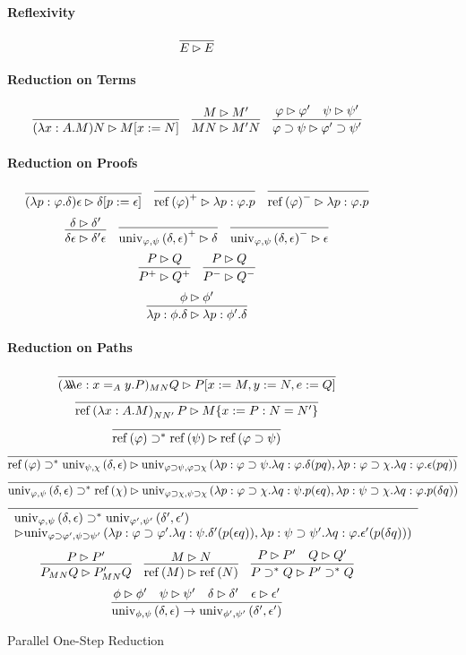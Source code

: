 \documentclass[a4paper,UKenglish]{lipics-v2016}
\newcommand*{\reff}[1]{\ensuremath{\mathrm{ref} \left( {#1} \right)}}
\newcommand*{\univ}[4]{\ensuremath{\mathrm{univ}_{{#1}, {#2}} \left({#3} , {#4} \right)}}
\newcommand*{\triplelambda}{\ensuremath{\lambda \!\! \lambda \!\! \lambda}}
\theoremstyle{plain}
\theoremstyle{definition}
\begin{document}
\begin{figure}
\paragraph*{Reflexivity}
$$ \infer{E \rhd E}{} $$
\paragraph*{Reduction on Terms}
$$ \infer{(\lambda x:A.M)N \rhd M[x:=N]}{} \quad
\infer{MN \rhd M'N}{M \rhd M'} \quad
\infer{\varphi \supset \psi \rhd \varphi' \supset \psi'}{\varphi \rhd \varphi' \quad \psi \rhd \psi'} $$
\paragraph*{Reduction on Proofs}
$$\infer{(\lambda p : \varphi . \delta)\epsilon \rhd \delta [ p := \epsilon ]}{} \quad
\infer{\reff{\varphi}^+ \rhd \lambda p : \varphi . p}{} \quad
\infer{\reff{\varphi}^- \rhd \lambda p : \varphi . p}{} $$
$$ \infer{\delta \epsilon \rhd \delta' \epsilon}{\delta \rhd \delta'} \quad
\infer{\univ{\varphi}{\psi}{\delta}{\epsilon}^+ \rhd \delta}{} \quad
\infer{\univ{\varphi}{\psi}{\delta}{\epsilon}^- \rhd \epsilon}{} $$
$$ \infer{P^+ \rhd Q^+}{P \rhd Q} \quad
\infer{P^- \rhd Q^-}{P \rhd Q}$$
$$ \infer{\lambda p:\phi.\delta \rhd \lambda p:\phi'.\delta}{\phi \rhd \phi'} $$
\paragraph*{Reduction on Paths}
$$\infer{(\triplelambda e:x =_A y.P)_{MN} Q \rhd P [x := M, y := N, e := Q]}{} $$
$$ \infer{\reff{\lambda x:A.M}_{N N'} P \rhd M \{ x:=P : N = N' \}}{} $$
$$ \infer{\reff{\varphi} \supset^* \reff{\psi} \rhd \reff{\varphi \supset \psi}}{} $$
$$ \infer{\reff{\varphi} \supset^* \univ{\psi}{\chi}{\delta}{\epsilon} \rhd
\univ{\varphi \supset \psi}{\varphi \supset \chi}{\lambda p:\varphi \supset \psi. \lambda q : \varphi. \delta (pq)}{\lambda p : \varphi \supset \chi. \lambda q : \varphi. \epsilon (pq)}}{} $$
$$ \infer{\univ{\varphi}{\psi}{\delta}{\epsilon} \supset^* \reff{\chi} \rhd
\univ{\varphi \supset \chi}{\psi \supset \chi}{\lambda p : \varphi \supset \chi. \lambda q : \psi. p (\epsilon q)}{\lambda p:\psi \supset \chi. \lambda q : \varphi. p(\delta q)}}{} $$
$$ \infer{\begin{array}{l}
\univ{\varphi}{\psi}{\delta}{\epsilon} \supset^* \univ{\varphi'}{\psi'}{\delta'}{\epsilon'} \\
 \rhd
\univ{\varphi \supset \varphi'}{\psi \supset \psi'}{\lambda p : \varphi \supset \varphi'. \lambda q : \psi. \delta' (p(\epsilon q))}{\lambda p : \psi \supset \psi'. \lambda q : \varphi. \epsilon' (p (\delta q))}
\end{array}}{} $$
$$ \infer{P_{MN} Q \rhd P'_{MN} Q}{P \rhd P'} \quad
\infer{\reff{M} \rhd \reff{N}}{M \rhd N} \quad
\infer{P \supset^* Q \rhd P' \supset^* Q}{P \rhd P' \quad Q \rhd Q'} $$
$$ \infer{\univ{\phi}{\psi}{\delta}{\epsilon} \rightarrow \univ{\phi'}{\psi'}{\delta'}{\epsilon'}}{\phi \rhd \phi' \quad \psi \rhd \psi' \quad \delta \rhd \delta' \quad \epsilon \rhd \epsilon'} $$
\caption{Parallel One-Step Reduction}
\label{fig:POSR}
\end{figure}
\end{document}
